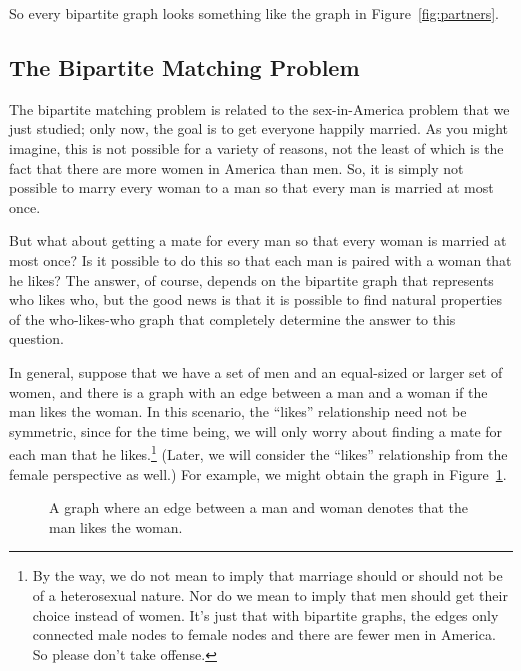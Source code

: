 \begin{editingnotes}
\end{editingnotes}

So every bipartite graph looks something like the graph in
Figure~\ref{fig:partners}.

\subsection{The Bipartite Matching Problem}

The bipartite matching problem is related to the sex-in-America
problem that we just studied; only now, the goal is to get everyone
happily married.  As you might imagine, this is not possible for a
variety of reasons, not the least of which is the fact that there are
more women in America than men.  So, it is simply not possible to
marry every woman to a man so that every man is married at most once.

But what about getting a mate for every man so that every woman is married
at most once?  Is it possible to do this so that each man is paired with a
woman that he likes?  The answer, of course, depends on the bipartite graph
that represents who likes who, but the good news is that it is possible to
find natural properties of the who-likes-who graph that completely
determine the answer to this question.

In general, suppose that we have a set of men and an equal-sized or
larger set of women, and there is a graph with an edge between a man
and a woman if the man likes the woman.  In this scenario,
the ``likes'' relationship need not be symmetric, since for the time
being, we will only worry about finding a mate for each man that he
likes.\footnote{By the way, we do not mean to imply that marriage
  should or should not be of a heterosexual nature.  Nor do we mean to
  imply that men should get their choice instead of women.  It's just
  that with bipartite graphs, the edges only connected male nodes to
  female nodes and there are fewer men in America.  So please don't
  take offense.}  (Later, we will consider the ``likes'' relationship
from the female perspective as well.)  For example, we might obtain
the graph in Figure~\ref{fig:5J}.

\begin{figure}



\caption{A graph where an edge between a man and woman denotes that
  the man likes the woman.}

\label{fig:5J}

\end{figure}

